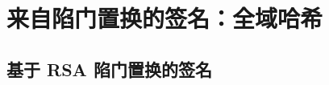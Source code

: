 \section{来自陷门置换的签名：全域哈希}\label{sec:13-3}

\begin{theorem}\label{theo:13-3}
	
\end{theorem}

\subsection{基于 RSA 陷门置换的签名}\label{subsec:13-3-1}

\begin{theorem}\label{theo:13-4}
	
\end{theorem}